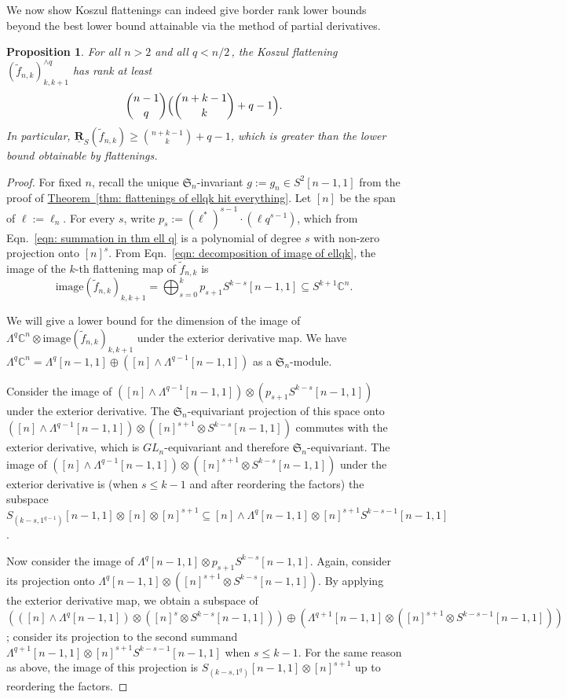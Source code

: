 \documentclass[11pt]{article}
\numberwithin{equation}{section}
\newtheorem{proposition}[theorem]{Proposition}
\theoremstyle{definition}
\theoremstyle{plain}
\newcommand{\expref}[2]{\hyperref[#2]{#1~\ref{#2}}}
\newcommand{\bbC}{\mathbb{C}}
\newcommand{\frakS}{\mathfrak{S}}
\renewcommand{\tilde}[1]{\widetilde{#1}}
\def\ww{\wedge}
\def\La#1{\Lambda^{#1}}
\def\tim{\mathrm{image}}
\def\ur{\underline {\mathbf R}}
\begin{document}
We now show Koszul flattenings can indeed give border rank lower bounds beyond the best lower bound attainable via the method of partial derivatives. 


\begin{proposition}\label{fknkosz}  For all $n > 2$ and all $q < {n}/{2}$\,, the Koszul flattening $(\tilde f_{n,k})_{k,k+1}^{\ww q}$ has rank at least
$$
\binom{n-1}q \Bigl(\binom{n+k-1}{k} +  q-1   \Bigr).
$$
In particular, $\ur_S(\tilde f_{n,k})\geq \binom{n+k-1}{k} +q-1$, which is greater than the lower bound obtainable by flattenings.
\end{proposition} 

\begin{proof}
  For fixed $n$, recall the unique $\frakS_n$-invariant $g := g_n \in S^2 [n-1,1]$ from the proof of \expref{Theorem}{thm: flattenings of ellqk hit everything}. Let $[n]$ be the span of $\ell:= \ell_n$.  For every $s$, write $p_s := (\ell^*)^{s-1} \cdot (\ell q^{s-1})$,  which from Eqn.~\eqref{eqn: summation in thm ell q} is a polynomial of degree $s$ with non-zero projection onto $[n]^s$. {}From Eqn.~\eqref{eqn: decomposition of image of ellqk}, the image of the $k$-th flattening map of $\tilde{f}_{n,k}$ is
  \[
    \tim (\tilde{f}_{n,k})_{k,k+1} = \bigoplus_{s=0}^k p_{s+1}S^{k-s}[n-1,1] \subseteq S^{k+1} \bbC^n.
    \]

We will give a lower bound for the dimension of the image of $ \Lambda^q \bbC^n \otimes \tim (\tilde{f}_{n,k})_{k,k+1}$ under the exterior
derivative map. We have $\Lambda^q \bbC^n = \Lambda^{q} [n-1,1] \oplus \left( [n] \wedge \Lambda^{q-1} [n-1,1] \right)$ as a $\frakS_n$-module.

Consider the image of $( [n]\ww \La{q-1}[n-1,1]) \otimes (p_{s+1}S^{k-s}[n-1,1])$ under the exterior derivative. The $\frakS_n$-equivariant projection of this space onto $( [n]\ww \La{q-1}[n-1,1]) \otimes ([n]^{s+1} \otimes S^{k-s}[n-1,1])$ commutes with the exterior derivative, which is $GL_n$-equivariant and therefore $\frakS_n$-equivariant. The image of $( [n]\ww \La{q-1}[n-1,1]) \otimes ([n]^{s+1} \otimes S^{k-s}[n-1,1])$ under the exterior derivative is (when $s\leq k-1$ and after reordering the factors) the subspace $S_{(k-s,1^{q-1})}[n-1,1]\otimes [n]\otimes [n]^{s+1} \subseteq [n]\ww \La q[n-1,1]\otimes [n]^{s+1}S^{k-s-1}[n-1,1]$.

Now consider the image of $\La{q }[n-1,1] \otimes p_{s+1}S^{k-s}[n-1,1]$. Again, consider its projection onto $\Lambda^q [n-1,1] \otimes ([n]^{s+1} \otimes S^{k-s}[n-1,1])$. By applying the exterior derivative map, we obtain a subspace of $\left(([n] \wedge \Lambda^q [n-1,1]) \otimes ([n]^{s} \otimes S^{k-s} [n-1,1])\right)\oplus  \left(\La{q+1}[n-1,1]\otimes ([n]^{s+1} \otimes S^{k-s-1}[n-1,1] )\right)$; consider its projection to the second summand $  \La {q+1}[n-1,1]\otimes [n]^{s+1}S^{k-s-1}[n-1,1]$ when $s\leq k-1$. For the same reason as above,  the image of this projection is $S_{(k-s,1^{q })}[n-1,1]\otimes [n]^{s+1}$ up to reordering the factors.


\end{proof}
\end{document}

